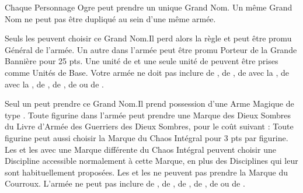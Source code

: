 \closearmyarmoury



\spaceaftersection{}

Chaque Personnage Ogre peut prendre un unique Grand Nom. Un même Grand Nom ne peut pas être dupliqué au sein d'une même armée.

\begin{multicols}{2}
\startpricelistNSP

Seuls les \mammothhunters{} peuvent choisir ce Grand Nom.\newline Il perd alors la règle \notaleader{} et peut être promu Général de l'armée. Un autre \mammothhunter{} dans l'armée peut être promu Porteur de la Grande Bannière pour 25 pts. Une unité de \yetis{} et une seule unité de \sabretoothtigers{} peuvent être prises comme Unités de Base. Votre armée ne doit pas inclure de \greatkhans{}, de \khans{}, de \shamans{} avec la \fireblessing{}, de \greatshamans{} avec la \greaterfireblessing{}, de \bruisers{}, de \mercenaryveterans{}, de \bombardiers{} ou de \thundercannons{}.

Seul un \greatkhan{} peut prendre ce Grand Nom.\newline Il prend possession d'une Arme Magique de type \ironfist{}. Toute figurine dans l'armée peut prendre une Marque des Dieux Sombres du Livre d'Armée des Guerriers des Dieux Sombres, pour le coût suivant :
Toute figurine peut aussi choisir la Marque du Chaos Intégral pour 3 pts par figurine.\newline
Les \shamans{} et les \greatshamans{} avec une Marque différente du Chaos Intégral peuvent choisir une Discipline accessible normalement à cette Marque, en plus des Disciplines qui leur sont habituellement proposées. Les \shamans{} et les \greatshamans{} ne peuvent pas prendre la Marque du Courroux.\newline
L'armée ne peut pas inclure de \mammothhunters{}, de \scraplings{}, de \scraplingtrappers{}, de \yetis{}, de \sabretoothtigers{} ou de \scratapults{}.


\end{multicols}
